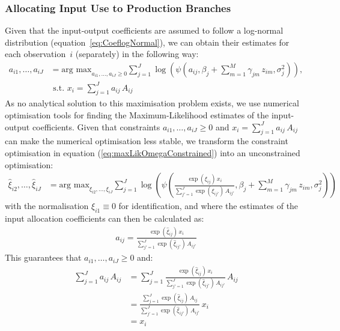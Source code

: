 \documentclass[12pt]{article}
\begin{document}
\subsubsection{Allocating Input Use to Production Branches}
\label{sec:maximum-likelihood-approach}
Given that the input-output coefficients are assumed to follow a log-normal distribution (equation~\ref{eq:CoeflogNormal}), we can obtain their estimates for each observation~$i$ (separately) in the following way:
\begin{align}
    a_{i1}, \ldots, a_{iJ}
    & = \text{arg max}_{a_{i1}, \ldots, a_{iJ} \geq 0}
    \sum_{j=1}^J \log \left( \psi \left( a_{ij}, 
        \beta_j+\sum_{m=1}^M \gamma_{jm} \, z_{im},
    \sigma_{j}^2 \right) \right),
    \label{eq:maxLikOmegaConstrained}\\
    & \text{ s.t. } 
    x_i = \sum_{j=1}^J a_{ij} \, A_{ij} \nonumber
\end{align}
As no analytical solution to this maximisation problem exists, we use numerical optimisation tools for finding the Maximum-Likelihood estimates of the input-output coefficients. 
Given that constraints $a_{i1},\ldots , a_{iJ} \geq 0$ and $x_i = \sum_{j=1}^J a_{ij} \, A_{ij}$ can make the numerical optimisation less stable, we transform the constraint optimisation in equation (\ref{eq:maxLikOmegaConstrained}) into an unconstrained optimisation:
\begin{align}
    \hat{\xi}_{i2}, \ldots, \hat{\xi}_{iJ}
    & = \text{arg max}_{\xi_{i2}, \ldots, \xi_{iJ} }
    \sum_{j=1}^J \log \left( \psi \left( 
        \frac{\exp( \xi_{ij} ) \, x_i }{
    \sum_{j'=1}^J \exp( \xi_{ij'} ) \, A_{ij'} }, 
        \beta_j+\sum_{m=1}^M \gamma_{jm} \, z_{im},
    \sigma_{j}^2 \right) \right)
    \label{eq:maxLikOmegaUnconstrained}
\end{align}
with the normalisation $\xi_{i1} \equiv 0$ for identification, and where the estimates of the input
allocation coefficients can then be calculated as:
\begin{align}
    a_{ij} = \frac{\exp( \hat{\xi}_{ij} ) \, x_i }{
    \sum_{j'=1}^J \exp( \hat{\xi}_{ij'} ) \, A_{ij'} }
    \label{eq:omegaHat}
\end{align}
This guarantees that $a_{i1}, \ldots, a_{iJ} \geq 0$ and:
\begin{align}
    \sum_{j=1}^J a_{ij} \, A_{ij}
    & = \sum_{j=1}^J \frac{\exp( \hat{\xi}_{ij} )  \, x_i}{
    \sum_{j'=1}^J \exp( \hat{\xi}_{ij'} ) \, A_{ij'} } 
    \, A_{ij}\\
    & = \frac{ \sum_{j=1}^J \exp( \hat{\xi}_{ij}) \, A_{ij} }{
    \sum_{j'=1}^J \exp( \hat{\xi}_{ij'} ) \, A_{ij'} } 
    \, x_i\\
& = x_i
\end{align}
\end{document}
